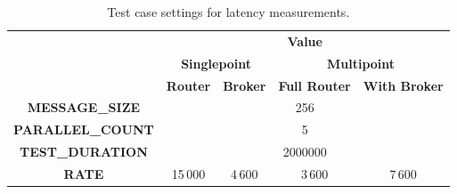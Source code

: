 \begingroup
\setlength{\tabcolsep}{10pt} %
\renewcommand{\arraystretch}{1.35} %
	\begin{table}[H]
	\centering
	\caption{Test case settings for latency measurements.}
	\label{tab:test_case_latency}
	\begin{tabular}{|c|c|c|c|c|}
	\hline
	\rowcolor[HTML]{C5E3DF}
	\cellcolor[HTML]{C5E3DF}                                         & \multicolumn{4}{c|}{\cellcolor[HTML]{C5E3DF}\textbf{Value}}                                                                          \\ \cline{2-5}
	\rowcolor[HTML]{C5E3DF}
	\cellcolor[HTML]{C5E3DF}                                         & \multicolumn{2}{c|}{\cellcolor[HTML]{C5E3DF}\textbf{Singlepoint}} & \multicolumn{2}{c|}{\cellcolor[HTML]{C5E3DF}\textbf{Multipoint}} \\ \cline{2-5}
	\rowcolor[HTML]{C5E3DF}
	\multirow{-3}{*}{\cellcolor[HTML]{C5E3DF}\textbf{Test Property}} & \textbf{Router}                            & \textbf{Broker}      & \textbf{Full Router}            & \textbf{With Broker}           \\ \hline
	\textbf{MESSAGE\_SIZE}                                           & \multicolumn{4}{c|}{256}                                                                                                             \\ \hline
	\textbf{PARALLEL\_COUNT}                                         & \multicolumn{4}{c|}{5}                                                                                                               \\ \hline
	\textbf{TEST\_DURATION}                                          & \multicolumn{4}{c|}{2000000}                                                                                                         \\ \hline
	\textbf{RATE}                                                    & \cellcolor[HTML]{FFFFFF}15\,000      & 4\,600                    & 3\,600                    & 7\,600                   \\ \hline
	\end{tabular}
	\end{table}
\endgroup

